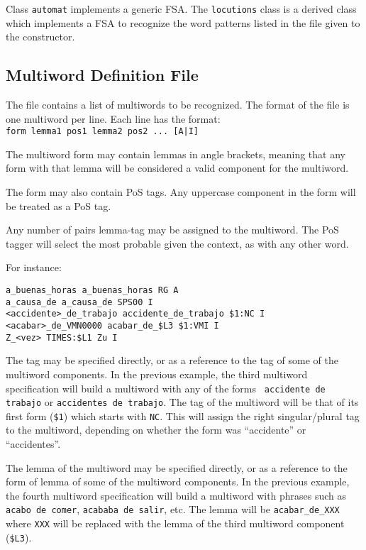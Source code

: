 \documentclass[a4paper]{book}
\begin{document}
  Class {\tt automat} implements a generic FSA. The {\tt locutions}
  class is a derived class which implements a FSA to recognize the
  word patterns listed in the file given to the constructor.

\subsection{Multiword Definition File}

The file contains a list of multiwords to be recognized. The format of
the file is one multiword per line. Each line has the format: \\
\verb#form lemma1 pos1 lemma2 pos2 ... [A|I]#

The multiword form may contain lemmas in angle brackets, meaning that
any form with that lemma will be considered a valid component for the
multiword.

The form may also contain PoS tags. Any uppercase component in the form
will be treated as a PoS tag.

 Any number of pairs lemma-tag may be assigned to the multiword. The
 PoS tagger will select the most probable given the context, as with
 any other word.

 For instance:
\begin{verbatim}
a_buenas_horas a_buenas_horas RG A
a_causa_de a_causa_de SPS00 I
<accidente>_de_trabajo accidente_de_trabajo $1:NC I
<acabar>_de_VMN0000 acabar_de_$L3 $1:VMI I
Z_<vez> TIMES:$L1 Zu I
\end{verbatim}
 
 The tag may be specified directly, or as a reference to the tag of
some of the multiword components. In the previous example, the third
multiword specification will build a multiword with any of the forms {\tt
 accidente de trabajo} or {\tt accidentes de trabajo}. The tag of the
multiword will be that of its first form ({\tt \$1}) which starts with
{\tt NC}.  This will assign the right singular/plural tag to the
multiword, depending on whether the form was ``accidente'' or ``accidentes''.

 The lemma of the multiword may be specified directly, or as a reference to the 
form of lemma of some of the multiword components.  In the previous example, the 
fourth multiword specification will build a multiword with phrases such as 
{\tt acabo de comer}, {\tt acababa de salir}, etc.  The lemma will be 
{\tt acabar\_de\_XXX} where {\tt XXX} will be replaced with the lemma of the 
third multiword component ({\tt \$L3}). 
\end{document}
